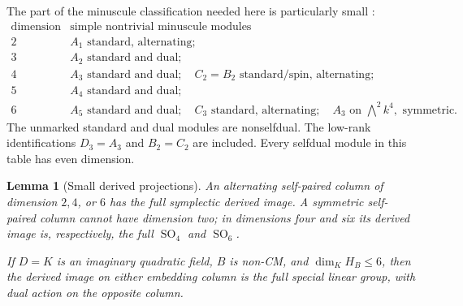 \documentclass[11pt]{article}
\newtheorem{lemma}[theorem]{Lemma}
\numberwithin{equation}{section}
\begin{document}
The part of the minuscule classification needed here is particularly
small \cite[Sections~27.2, 30.4, and~32.1]{Etingof2024Lie}:
\[
\begin{array}{c|l}
 \text{dimension}&\text{simple nontrivial minuscule modules}\\ \hline
 2&A_1\text{ standard, alternating};\\
 3&A_2\text{ standard and dual};\\
 4&A_3\text{ standard and dual};\quad C_2=B_2
       \text{ standard/spin, alternating};\\
 5&A_4\text{ standard and dual};\\
 6&A_5\text{ standard and dual};\quad C_3\text{ standard, alternating};
       \quad A_3\text{ on }\bigwedge^2k^4,\text{ symmetric}.
\end{array}
\]
The unmarked standard and dual modules are nonselfdual.  The
low-rank identifications \(D_3=A_3\) and \(B_2=C_2\) are included.
Every selfdual module in this table has even dimension.

\begin{lemma}[Small derived projections]
\label{p3ab:small-projections}
An alternating self-paired column of dimension \(2,4\), or \(6\)
has the full symplectic derived image.  A symmetric self-paired
column cannot have dimension two; in dimensions four and six its
derived image is, respectively, the full \(\operatorname{SO}_4\)
and \(\operatorname{SO}_6\).

If \(D=K\) is an imaginary quadratic field, \(B\) is non-CM, and
\(\dim_K H_B\leq6\), then the derived image on either embedding
column is the full special linear group, with dual action on the
opposite column.
\end{lemma}
\end{document}

